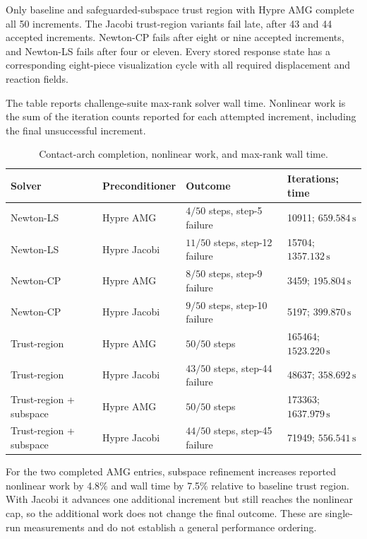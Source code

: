 \documentclass[11pt]{article}
\begin{document}
Only baseline and safeguarded-subspace trust region with Hypre AMG complete
all 50 increments.  The Jacobi trust-region variants fail late, after 43 and
44 accepted increments.  Newton-CP fails after eight or nine accepted
increments, and Newton-LS fails after four or eleven.  Every stored response
state has a corresponding eight-piece visualization cycle with all required
displacement and reaction fields.

The table reports challenge-suite max-rank solver wall time.  Nonlinear work
is the sum of the iteration counts reported for each attempted increment,
including the final unsuccessful increment.

\begin{table}[h]
  \centering
  \small
  \caption{Contact-arch completion, nonlinear work, and max-rank wall time.}
  \begin{tabular}{@{}llll@{}}
    \toprule
    Solver & Preconditioner & Outcome & Iterations; time \\
    \midrule
    Newton-LS & Hypre AMG & $4/50$ steps, step-5 failure & 10911; $659.584\,\mathrm{s}$ \\
    Newton-LS & Hypre Jacobi & $11/50$ steps, step-12 failure & 15704; $1357.132\,\mathrm{s}$ \\
    Newton-CP & Hypre AMG & $8/50$ steps, step-9 failure & 3459; $195.804\,\mathrm{s}$ \\
    Newton-CP & Hypre Jacobi & $9/50$ steps, step-10 failure & 5197; $399.870\,\mathrm{s}$ \\
    Trust-region & Hypre AMG & $50/50$ steps & 165464; $1523.220\,\mathrm{s}$ \\
    Trust-region & Hypre Jacobi & $43/50$ steps, step-44 failure & 48637; $358.692\,\mathrm{s}$ \\
    Trust-region + subspace & Hypre AMG & $50/50$ steps & 173363; $1637.979\,\mathrm{s}$ \\
    Trust-region + subspace & Hypre Jacobi & $44/50$ steps, step-45 failure & 71949; $556.541\,\mathrm{s}$ \\
    \bottomrule
  \end{tabular}
\end{table}

For the two completed AMG entries, subspace refinement increases reported
nonlinear work by 4.8\% and wall time by 7.5\% relative to baseline trust
region.  With Jacobi it advances one additional increment but still reaches
the nonlinear cap, so the additional work does not change the final outcome.
These are single-run measurements and do not establish a general performance
ordering.
\end{document}
